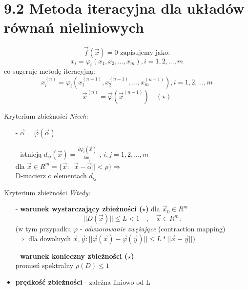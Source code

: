 \section{9.2 Metoda iteracyjna dla układów równań nieliniowych}

\begin{frame}{}
  $$\boxed{\overrightarrow{f}(\overrightarrow{x})=0}\text{ zapisujemy jako:}$$
  $$x_i=\varphi_i(x_1,x_2,...,x_m) , i=1,2,...,m$$
  co sugeruje metodę iteracyjną:
  $$x_i^{(n)}=\varphi_i(x_1^{(n-1)},x_2^{(n-1)},...,x_m^{(n-1)}) , i=1,2,...,m$$
  $$\boxed{\overrightarrow{x}^{(n)}=\overrightarrow{\varphi}(\overrightarrow{x}^{(n-1)})}\quad(\star)$$
\end{frame}

\begin{frame}{}
  \begin{block}{Kryterium zbieżności}
  	\emph{Niech:}
    \begin{itemize}
      \item[-] $\overrightarrow{\alpha}=\overrightarrow{\varphi}(\overrightarrow{\alpha})$
      \item[-] istnieją $d_{ij}(\overrightarrow{x})=\frac{\partial\varphi_i(\overrightarrow{x})}{\partial x_j}$ , $i,j=1,2,...,m$\\
      dla $\overrightarrow{x}\in R^m=\{\overrightarrow{x}:||\overrightarrow{x}-\overrightarrow{\alpha}||<\rho\} \Rightarrow$\\
      D-macierz o elementach $d_{ij}$
    \end{itemize}
  \end{block}
\end{frame}

\begin{frame}{}
  \begin{block}{Kryterium zbieżności}
    \emph{Wtedy:}
    \begin{itemize}
      \item[-] \textbf{warunek wystarczający zbieżności ($\star$)} dla $\overrightarrow{x}_0\in R^m$\\
      $$||D(\overrightarrow{x})||\leq L<1\quad,\quad\overrightarrow{x}\in R^m:$$
      (w tym przypadku $\varphi$ - \emph{odwzorowanie zwężające} (contraction mapping)\\ $\Rightarrow$ dla dowolnych $\overrightarrow{x},\overrightarrow{y}: ||\overrightarrow{\varphi}(\overrightarrow{x})-\overrightarrow{\varphi}(\overrightarrow{y})||\leq L*||\overrightarrow{x}-\overrightarrow{y}||)$
      \item[-] \textbf{warunek konieczny zbieżności ($\star$)}\\
      promień spektralny $\rho(D)\leq 1$
      \item \textbf{prędkość zbieżności} - zależna liniowo od L
    \end{itemize}
  \end{block}
\end{frame}